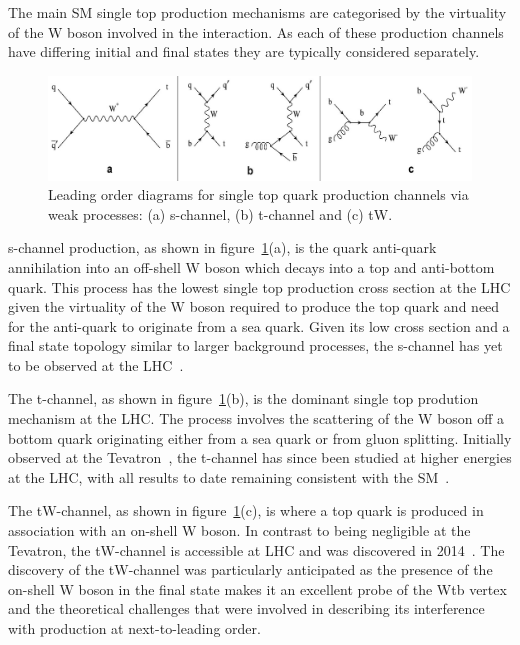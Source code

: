 The main SM single top production mechanisms are categorised by the virtuality of the W boson involved in the interaction.
As each of these production channels have differing initial and final states they are typically considered separately.

\begin{figure}[!h]
\centering
\includegraphics[width=1.00\textwidth]{figs/top-physics/singletop_feyn.jpg}
\caption{Leading order diagrams for single top quark production channels via weak processes: (a) s-channel, (b) t-channel and (c) tW.}
\label{fig:singleTopDiagrams}
\end{figure}

s-channel production, as shown in figure~\ref{fig:singleTopDiagrams}(a), is the quark anti-quark annihilation into an off-shell W boson which decays into a top and anti-bottom quark.
This process has the lowest single top production cross section at the LHC given the virtuality of the W boson required to produce the top quark and need for the anti-quark to originate from a sea quark.
Given its low cross section and a final state topology similar to larger background processes, the s-channel has yet to be observed at the LHC~\cite{Khachatryan:2016ewo}.

The t-channel, as shown in figure~\ref{fig:singleTopDiagrams}(b), is the dominant single top prodution mechanism at the LHC.
The process involves the scattering of the W boson off a bottom quark originating either from a sea quark or from gluon splitting.
Initially observed at the Tevatron~\cite{Aaltonen:2009jj,Abazov:2009ii}, the t-channel has since been studied at higher energies at the LHC, with all results to date remaining consistent with the SM~\cite{Berta:2017ghf,Morton:2018wkb}.	

The tW-channel, as shown in figure~\ref{fig:singleTopDiagrams}(c), is where a top quark is produced in association with an on-shell W boson.
In contrast to being negligible at the Tevatron, the tW-channel is accessible at LHC and was discovered in 2014~\cite{Chatrchyan:2014tua}.
The discovery of the tW-channel was particularly anticipated as the presence of the on-shell W boson in the final state makes it an excellent probe of the Wtb vertex and the theoretical challenges that were involved in describing its interference with \ttbar production at next-to-leading order.

